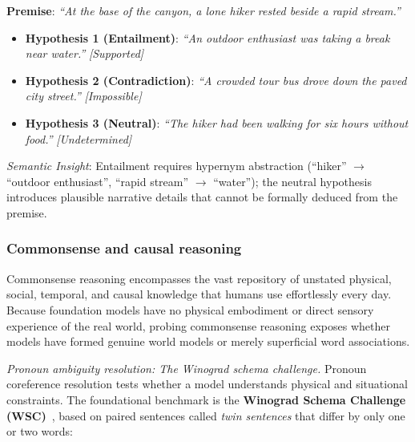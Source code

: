 \documentclass[../../main.tex]{subfiles}
\begin{document}
\begin{center}
\begin{minipage}{0.95\textwidth}
\begin{tcolorbox}[colback=cardBg,colframe=cardLine,arc=2pt,boxrule=0.5pt,title=\textbf{Task Example: Natural Language Inference (MultiNLI)}]
\small\sffamily
\textbf{Premise}: \textit{``At the base of the canyon, a lone hiker rested beside a rapid stream.''}
\begin{itemize}[leftmargin=1.5em,itemsep=2pt]
    \item \textbf{Hypothesis 1 (Entailment)}: \textit{``An outdoor enthusiast was taking a break near water.''} \hfill \textit{[Supported]}
    \item \textbf{Hypothesis 2 (Contradiction)}: \textit{``A crowded tour bus drove down the paved city street.''} \hfill \textit{[Impossible]}
    \item \textbf{Hypothesis 3 (Neutral)}: \textit{``The hiker had been walking for six hours without food.''} \hfill \textit{[Undetermined]}
\end{itemize}
\textit{Semantic Insight}: Entailment requires hypernym abstraction (``hiker'' $\to$ ``outdoor enthusiast'', ``rapid stream'' $\to$ ``water''); the neutral hypothesis introduces plausible narrative details that cannot be formally deduced from the premise.
\end{tcolorbox}
\end{minipage}
\end{center}

\subsubsection{Commonsense and causal reasoning}
\label{subsec:commonsense_causal_reasoning}
Commonsense reasoning encompasses the vast repository of unstated physical, social, temporal, and causal knowledge that humans use effortlessly every day. Because foundation models have no physical embodiment or direct sensory experience of the real world, probing commonsense reasoning exposes whether models have formed genuine world models or merely superficial word associations.

\textit{Pronoun ambiguity resolution: The Winograd schema challenge.}
Pronoun coreference resolution tests whether a model understands physical and situational constraints. The foundational benchmark is the \textbf{Winograd Schema Challenge (WSC)}~\cite{levesque2012winograd}, based on paired sentences called \textit{twin sentences} that differ by only one or two words:
\end{document}

